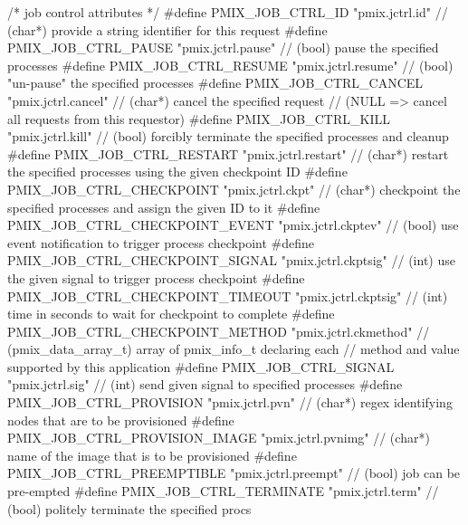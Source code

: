 \begin{codepar}
/* job control attributes */
#define PMIX_JOB_CTRL_ID                    "pmix.jctrl.id"         // (char*) provide a string identifier for this request
#define PMIX_JOB_CTRL_PAUSE                 "pmix.jctrl.pause"      // (bool) pause the specified processes
#define PMIX_JOB_CTRL_RESUME                "pmix.jctrl.resume"     // (bool) "un-pause" the specified processes
#define PMIX_JOB_CTRL_CANCEL                "pmix.jctrl.cancel"     // (char*) cancel the specified request
                                                                    //         (NULL => cancel all requests from this requestor)
#define PMIX_JOB_CTRL_KILL                  "pmix.jctrl.kill"       // (bool) forcibly terminate the specified processes and cleanup
#define PMIX_JOB_CTRL_RESTART               "pmix.jctrl.restart"    // (char*) restart the specified processes using the given checkpoint ID
#define PMIX_JOB_CTRL_CHECKPOINT            "pmix.jctrl.ckpt"       // (char*) checkpoint the specified processes and assign the given ID to it
#define PMIX_JOB_CTRL_CHECKPOINT_EVENT      "pmix.jctrl.ckptev"     // (bool) use event notification to trigger process checkpoint
#define PMIX_JOB_CTRL_CHECKPOINT_SIGNAL     "pmix.jctrl.ckptsig"    // (int) use the given signal to trigger process checkpoint
#define PMIX_JOB_CTRL_CHECKPOINT_TIMEOUT    "pmix.jctrl.ckptsig"    // (int) time in seconds to wait for checkpoint to complete
#define PMIX_JOB_CTRL_CHECKPOINT_METHOD     "pmix.jctrl.ckmethod"   // (pmix_data_array_t) array of pmix_info_t declaring each
                                                                    //      method and value supported by this application
#define PMIX_JOB_CTRL_SIGNAL                "pmix.jctrl.sig"        // (int) send given signal to specified processes
#define PMIX_JOB_CTRL_PROVISION             "pmix.jctrl.pvn"        // (char*) regex identifying nodes that are to be provisioned
#define PMIX_JOB_CTRL_PROVISION_IMAGE       "pmix.jctrl.pvnimg"     // (char*) name of the image that is to be provisioned
#define PMIX_JOB_CTRL_PREEMPTIBLE           "pmix.jctrl.preempt"    // (bool) job can be pre-empted
#define PMIX_JOB_CTRL_TERMINATE             "pmix.jctrl.term"       // (bool) politely terminate the specified procs


\end{codepar}
